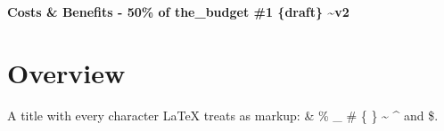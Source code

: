 \documentclass[
]{article}
\author{}
\date{}
\begin{document}
\begin{center}

\end{center}

\vspace{2em}

\begin{center}
\Large\textbf{Costs \& Benefits - 50\% of the\_budget \#1 \{draft\} \textasciitilde{}v2}
\end{center}

\vspace{8em}
\newpage

\section{Overview}\label{overview}

A title with every character LaTeX treats as markup: \& \% \_ \# \{ \}
\textasciitilde{} \^{} and \$.
\end{document}

